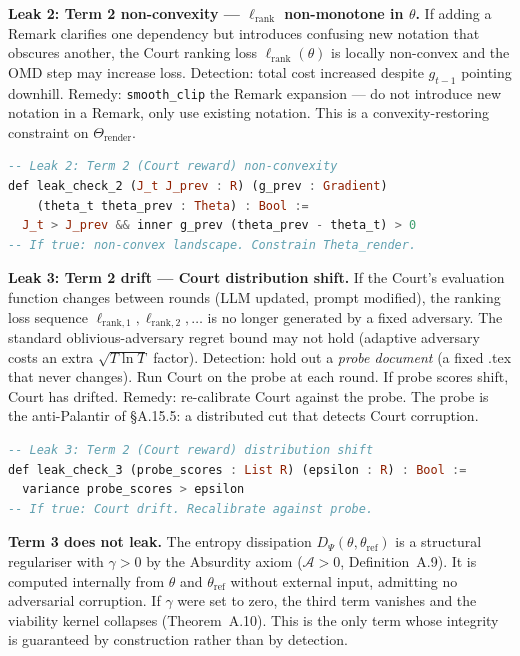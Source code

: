 \documentclass[11pt,a4paper]{article}
\theoremstyle{definition}
\theoremstyle{remark}
\begin{document}
\textbf{Leak 2: Term 2 non-convexity --- $\ell_{\mathrm{rank}}$ non-monotone in $\theta$.} If adding a Remark clarifies one dependency but introduces confusing new notation that obscures another, the Court ranking loss $\ell_{\mathrm{rank}}(\theta)$ is locally non-convex and the OMD step may increase loss. Detection: total cost increased despite $g_{t-1}$ pointing downhill. Remedy: \texttt{smooth\_clip} the Remark expansion --- do not introduce new notation in a Remark, only use existing notation. This is a convexity-restoring constraint on $\Theta_{\mathrm{render}}$.

\begin{lstlisting}[language=Haskell]
-- Leak 2: Term 2 (Court reward) non-convexity
def leak_check_2 (J_t J_prev : R) (g_prev : Gradient)
    (theta_t theta_prev : Theta) : Bool :=
  J_t > J_prev && inner g_prev (theta_prev - theta_t) > 0
-- If true: non-convex landscape. Constrain Theta_render.
\end{lstlisting}

\textbf{Leak 3: Term 2 drift --- Court distribution shift.} If the Court's evaluation function changes between rounds (LLM updated, prompt modified), the ranking loss sequence $\ell_{\mathrm{rank},1}, \ell_{\mathrm{rank},2}, \ldots$ is no longer generated by a fixed adversary. The standard oblivious-adversary regret bound may not hold (adaptive adversary costs an extra $\sqrt{T \ln T}$ factor). Detection: hold out a \emph{probe document} (a fixed .tex that never changes). Run Court on the probe at each round. If probe scores shift, Court has drifted. Remedy: re-calibrate Court against the probe. The probe is the anti-Palantir of \S A.15.5: a distributed cut that detects Court corruption.

\begin{lstlisting}[language=Haskell]
-- Leak 3: Term 2 (Court reward) distribution shift
def leak_check_3 (probe_scores : List R) (epsilon : R) : Bool :=
  variance probe_scores > epsilon
-- If true: Court drift. Recalibrate against probe.
\end{lstlisting}

\textbf{Term 3 does not leak.} The entropy dissipation $D_\Psi(\theta, \theta_{\mathrm{ref}})$ is a structural regulariser with $\gamma > 0$ by the Absurdity axiom ($\mathcal{A} > 0$, Definition~A.9). It is computed internally from $\theta$ and $\theta_{\mathrm{ref}}$ without external input, admitting no adversarial corruption. If $\gamma$ were set to zero, the third term vanishes and the viability kernel collapses (Theorem~A.10). This is the only term whose integrity is guaranteed by construction rather than by detection.
\end{document}
